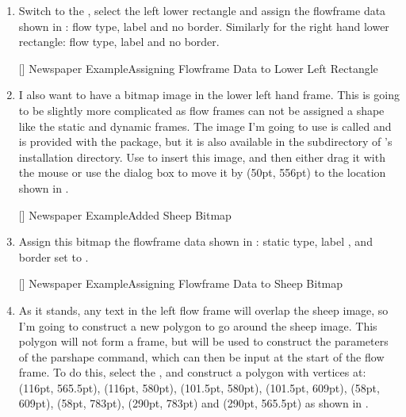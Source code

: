\begin{enumerate}
[]
{}
{Newspaper Example\dash Added Lower Left and Right
Rectangles}

\item Switch to the , select
the left lower rectangle and assign the \gls{flowframe} data shown in
: flow type, label  and no border. 
Similarly for the right hand lower rectangle: flow type, label
 and no border.

[]
{}
{Newspaper Example\dash Assigning Flowframe Data to Lower
Left Rectangle}

\item I also want to have a \gls{bitmap} image in the lower left hand frame.
This is going to be slightly more complicated as flow frames
can not be assigned a shape like the static and dynamic frames.
The image I'm going to use is called  and is
provided with the  package, but it is also
available in the  subdirectory of \FlowframTk's
installation directory. Use 
to insert this image, and then either drag it with the mouse or use
the  dialog box to move it by (50pt, 556pt)
to the location shown in .

[]
{}
{Newspaper Example\dash Added Sheep Bitmap}

\item Assign this \gls{bitmap} the \gls{flowframe} data shown in
: static type, label , and
border set to .

[]
{}
{Newspaper Example\dash Assigning Flowframe Data to Sheep
Bitmap}

\item As it stands, any text in the left flow frame will overlap
the sheep image, so I'm going to construct a new polygon to go
around the sheep image. This polygon will not form a frame, but
will be used to construct the parameters of the \gls{parshape}
command, which can then be input at the start of the flow frame.
To do this, select the , and construct a polygon
with vertices at: (116pt, 565.5pt), (116pt, 580pt), (101.5pt, 580pt),
(101.5pt, 609pt), (58pt, 609pt), (58pt, 783pt), (290pt, 783pt)
and (290pt, 565.5pt) as shown in .


\end{enumerate}
